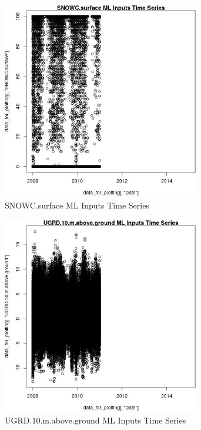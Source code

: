 \begin{figure} 
\centering  
\includegraphics[width=0.77\textwidth]{Code_Outputs/ML_input_report_ML_input_PM25_Step5_part_d_de_duplicated_aves_ML_input_SNOWC.surfaceTS.jpg} 
\caption{\label{fig:ML_input_report_ML_input_PM25_Step5_part_d_de_duplicated_aves_ML_inputSNOWC.surfaceTS}SNOWC.surface ML Inputs Time Series} 
\end{figure} 
 

\begin{figure} 
\centering  
\includegraphics[width=0.77\textwidth]{Code_Outputs/ML_input_report_ML_input_PM25_Step5_part_d_de_duplicated_aves_ML_input_UGRD.10.m.above.groundTS.jpg} 
\caption{\label{fig:ML_input_report_ML_input_PM25_Step5_part_d_de_duplicated_aves_ML_inputUGRD.10.m.above.groundTS}UGRD.10.m.above.ground ML Inputs Time Series} 
\end{figure} 
 

